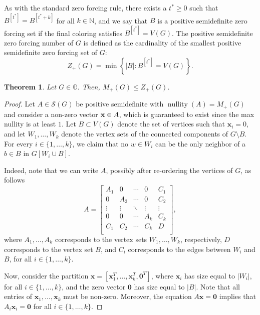 \documentclass{article}
\newtheorem{theorem}{Theorem}[section]
\theoremstyle{definition}
\newcommand\abs[1]{\left|#1\right|}
\newcommand\nullity[1]{\operatorname{nullity}\left(#1\right)}
\begin{document}
As with the standard zero forcing rule, there exists a $t^{*}\geq 0$ such that $B^{[t^{*}]} = B^{[t^{*}+k]}$ for all $k\in\mathbb{N}$, and we say that $B$ is a positive semidefinite zero forcing set if the final coloring satisfies $B^{[t^{*}]} = V(G)$.
The positive semidefinite zero forcing number of $G$ is defined as the cardinality of the smallest positive semidefinite zero forcing set of $G$:
\[
Z_{+}(G) = \min\left\{\abs{B}\colon B^{[t^{*}]} = V(G)\right\}.
\]
\begin{theorem}\label{thm:psd-max-nul-zero-forcing}
Let $G\in\mathbb{G}$.
Then, $M_{+}(G)\leq Z_{+}(G)$.
\end{theorem}
\begin{proof}
Let $A\in\mathcal{S}(G)$ be positive semidefinite with $\nullity{A}=M_{+}(G)$ and consider a non-zero vector $\textbf{x}\in\null{A}$, which is guaranteed to exist since the max nullity is at least $1$.
Let $B\subset V(G)$ denote the set of vertices such that $\textbf{x}_{i}=0$, and let $W_{1},\ldots,W_{k}$ denote the vertex sets of the connected components of $G\setminus{B}$.
For every $i\in\{1,\ldots,k\}$, we claim that no $w\in W_{i}$ can be the only neighbor of a $b\in B$ in $G[W_{i}\cup B]$.

Indeed, note that we can write $A$, possibly after re-ordering the vertices of $G$, as follows 
\[
A = \begin{bmatrix}
		A_{1} & 0 & \cdots & 0 & C_{1} \\
		0 & A_{2} & \cdots & 0 & C_{2} \\
		\vdots & \vdots & \ddots & \vdots & \vdots \\
		0 & 0 & \cdots & A_{k} & C_{k} \\
		C_{1} & C_{2} & \cdots & C_{k} & D \\
		\end{bmatrix},
\]
where $A_{1},\ldots,A_{k}$ corresponds to the vertex sets $W_{1},\ldots,W_{k}$, respectively, $D$ corresponds to the vertex set $B$, and $C_{i}$ corresponds to the edges between $W_{i}$ and $B$, for all $i\in\{1,\ldots,k\}$.

Now, consider the partition $\textbf{x} = [\textbf{x}_{1}^{T},\ldots,\textbf{x}_{k}^{T},\textbf{0}^{T}]$, where $\textbf{x}_{i}$ has size equal to $\abs{W_{i}}$, for all $i\in\{1,\ldots,k\}$, and the zero vector $\textbf{0}$ has size equal to $\abs{B}$.
Note that all entries of $\textbf{x}_{1},\ldots,\textbf{x}_{k}$ must be non-zero.
Moreover, the equation $A\textbf{x}=\textbf{0}$ implies that $A_{i}\textbf{x}_{i}=\textbf{0}$ for all $i\in\{1,\ldots,k\}$.


\end{proof}
\end{document}
